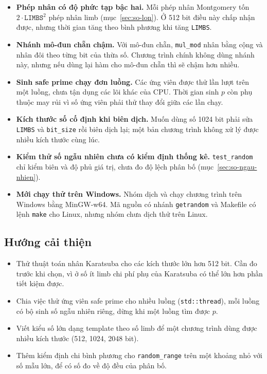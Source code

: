 \begin{itemize}
  \item \textbf{Phép nhân có độ phức tạp bậc hai.} Mỗi phép nhân Montgomery tốn $2 \cdot \texttt{LIMBS}^2$ phép nhân limb (mục~\ref{sec:so-lon}). Ở 512 bit điều này chấp nhận được, nhưng thời gian tăng theo bình phương khi tăng \texttt{LIMBS}.
  \item \textbf{Nhánh mô-đun chẵn chậm.} Với mô-đun chẵn, \texttt{mul\_mod} nhân bằng cộng và nhân đôi theo từng bit của thừa số. Chương trình chính không dùng nhánh này, nhưng nếu dùng lại hàm cho mô-đun chẵn thì sẽ chậm hơn nhiều.
  \item \textbf{Sinh safe prime chạy đơn luồng.} Các ứng viên được thử lần lượt trên một luồng, chưa tận dụng các lõi khác của CPU. Thời gian sinh $p$ còn phụ thuộc may rủi vì số ứng viên phải thử thay đổi giữa các lần chạy.
  \item \textbf{Kích thước số cố định khi biên dịch.} Muốn dùng số 1024 bit phải sửa \texttt{LIMBS} và \texttt{bit\_size} rồi biên dịch lại; một bản chương trình không xử lý được nhiều kích thước cùng lúc.
  \item \textbf{Kiểm thử số ngẫu nhiên chưa có kiểm định thống kê.} \texttt{test\_random} chỉ kiểm biên và độ phủ giá trị, chưa đo độ lệch phân bố (mục~\ref{sec:so-ngau-nhien}).
  \item \textbf{Mới chạy thử trên Windows.} Nhóm dịch và chạy chương trình trên Windows bằng MinGW-w64. Mã nguồn có nhánh \texttt{getrandom} và Makefile có lệnh \texttt{make} cho Linux, nhưng nhóm chưa dịch thử trên Linux.
\end{itemize}

\subsection{Hướng cải thiện}

\begin{itemize}
  \item Thử thuật toán nhân Karatsuba cho các kích thước lớn hơn 512 bit. Cần đo trước khi chọn, vì ở số ít limb chi phí phụ của Karatsuba có thể lớn hơn phần tiết kiệm được.
  \item Chia việc thử ứng viên safe prime cho nhiều luồng (\texttt{std::thread}), mỗi luồng có bộ sinh số ngẫu nhiên riêng, dừng khi một luồng tìm được $p$.
  \item Viết kiểu số lớn dạng template theo số limb để một chương trình dùng được nhiều kích thước (512, 1024, 2048 bit).
  \item Thêm kiểm định chi bình phương cho \texttt{random\_range} trên một khoảng nhỏ với số mẫu lớn, để có số đo về độ đều của phân bố.
\end{itemize}

